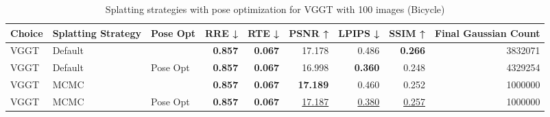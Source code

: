 \begin{table}[H]
\caption{Splatting strategies with pose optimization for VGGT with 100 images (Bicycle)}
\label{tab:09_splatting_strategy_pose_opt_bicycle}
\begin{tabular}{lllrrrrrr}
\toprule
Choice & Splatting Strategy & Pose Opt & RRE ↓ & RTE ↓ & PSNR ↑ & LPIPS ↓ & SSIM ↑ & Final Gaussian Count \\
\midrule
VGGT & Default &  & \textbf{0.857} & \textbf{0.067} & 17.178 & 0.486 & \textbf{0.266} & 3832071 \\
VGGT & Default & Pose Opt & \textbf{0.857} & \textbf{0.067} & 16.998 & \textbf{0.360} & 0.248 & 4329254 \\
VGGT & MCMC &  & \textbf{0.857} & \textbf{0.067} & \textbf{17.189} & 0.460 & 0.252 & 1000000 \\
VGGT & MCMC & Pose Opt & \textbf{0.857} & \textbf{0.067} & \underline{17.187} & \underline{0.380} & \underline{0.257} & 1000000 \\
\bottomrule
\end{tabular}
\end{table}
